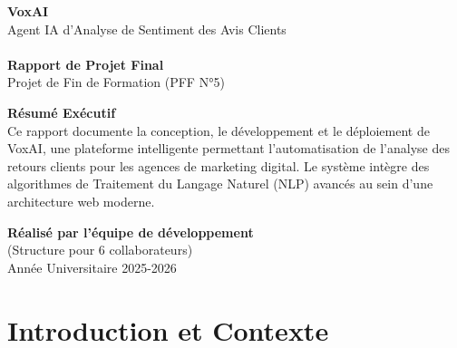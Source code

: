 \documentclass[12pt,a4paper]{article}
\begin{document}
\begin{titlepage}
    \centering
    \vspace*{2cm}
    
    {\Huge \textcolor{primary}{\textbf{VoxAI}}}\\[0.5cm]
    {\LARGE Agent IA d'Analyse de Sentiment des Avis Clients}\\[1cm]
    
    \noindent\makebox[\linewidth]{\rule{\textwidth}{1pt}}\\[1cm]
    
    {\Large \textbf{Rapport de Projet Final}}\\[0.5cm]
    {\large Projet de Fin de Formation (PFF N°5)}\\[2cm]
    
    \begin{mdframed}[linecolor=primary, linewidth=2pt, backgroundcolor=lightgray, roundcorner=10pt, padding=15pt]
        \centering
        \textbf{Résumé Exécutif}\\[0.5cm]
        Ce rapport documente la conception, le développement et le déploiement de VoxAI, une plateforme intelligente permettant l'automatisation de l'analyse des retours clients pour les agences de marketing digital. Le système intègre des algorithmes de Traitement du Langage Naturel (NLP) avancés au sein d'une architecture web moderne.
    \end{mdframed}
    
    \vfill
    
    {\large \textbf{Réalisé par l'équipe de développement}}\\[0.2cm]
    {\normalsize (Structure pour 6 collaborateurs)}\\[2cm]
    
    {\large Année Universitaire 2025-2026}
\end{titlepage}

\newpage
\tableofcontents
{}
\newpage

\section{Introduction et Contexte}
\end{document}
